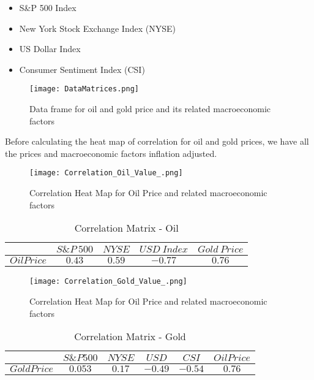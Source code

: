 \documentclass[runningheads]{llncs}
\begin{document}
\begin {itemize}
\item S\&P 500 Index \cite{quandal}
\item New York Stock Exchange Index (NYSE) \cite{quandal}
\item US Dollar Index \cite{quandal}
\item Consumer Sentiment Index (CSI) \cite{csi}
\end {itemize}

\begin{figure}
\centering
\texttt{[image: DataMatrices.png]}
\caption{Data frame for oil and gold price and its related macroeconomic factors}
\label{fig:DataMatrices.png}
\end{figure}

\noindent Before calculating the heat map of correlation for oil and gold prices, we have all the prices and macroeconomic factors inflation adjusted.

\begin{figure}
\centering
\texttt{[image: Correlation\_Oil\_Value\_.png]}
\caption{Correlation Heat Map for Oil Price and related macroeconomic factors}
\label{fig:Correlation_Oil_Value_.png}
\end{figure}

\begin{table}
\begin{center}
\begin{tabular}{|c|c|c|c|c|}
\hline
$ $ & $ S\&P\ 500 $ & $ NYSE $ & $ USD\ Index $ & $Gold\ Price$ \\ \hline
$Oil Price$ & $0.43$ & $0.59$ & $-0.77$ & $0.76$ \\ \hline
\end{tabular}
\end{center}
\caption{Correlation Matrix - Oil}
\end{table}

\begin{figure}
\centering
\texttt{[image: Correlation\_Gold\_Value\_.png]}
\caption{Correlation Heat Map for Oil Price and related macroeconomic factors}
\label{fig:Correlation_Gold_Value_.png}
\end{figure}

\begin{table}
\begin{center}
\begin{tabular}{|c|c|c|c|c|c|}
\hline
$ $ & $ S\&P 500 $ & $ NYSE $ & $ USD $  & $CSI$ &$Oil Price$ \\  \hline
$Gold Price$ & $0.053$ & $0.17$ & $-0.49$ & $-0.54$ & $0.76$ \\ \hline
\end{tabular}
\end{center}
\caption{Correlation Matrix - Gold}
\end{table}
\end{document}
